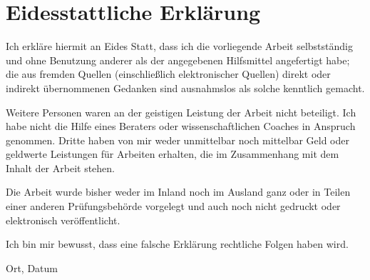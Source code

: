 \pagestyle{empty}
\section*{Eidesstattliche Erklärung}

Ich erkläre hiermit an Eides Statt, dass ich die vorliegende Arbeit selbstständig und ohne Benutzung anderer als der angegebenen Hilfsmittel angefertigt habe; die aus fremden Quellen (einschließlich elektronischer Quellen) direkt oder indirekt übernommenen Gedanken sind ausnahmslos als solche kenntlich gemacht.


Weitere Personen waren an der geistigen Leistung der Arbeit nicht beteiligt. Ich habe nicht die Hilfe eines Beraters oder wissenschaftlichen Coaches in Anspruch genommen. Dritte haben von mir weder unmittelbar noch mittelbar Geld oder geldwerte Leistungen für Arbeiten erhalten, die im Zusammenhang mit dem Inhalt der Arbeit stehen.

Die Arbeit wurde bisher weder im Inland noch im Ausland ganz oder in Teilen einer anderen Prüfungsbehörde vorgelegt und auch noch nicht gedruckt oder elektronisch veröffentlicht.

Ich bin mir bewusst, dass eine falsche Erklärung rechtliche Folgen haben wird.

\vspace{1.0cm}

\begingroup
\raggedright{\underline{\hspace{5.0cm}}}
\hfill
\raggedleft{\underline{\hspace{5.0cm}}}
\endgroup

\vspace{-0.3cm}

\begingroup
\raggedright{Ort, Datum}
\hfill
{}
\endgroup